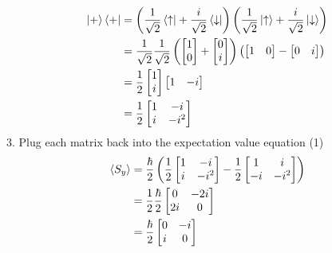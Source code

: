 \documentclass[12pt]{article}
\begin{document}
\begin{equation}
    \begin{split}
        \ket{+}\bra{+} &= \left(\frac{1}{\sqrt{2}}\bra{\uparrow} + \frac{i}{\sqrt{2}}\bra{\downarrow}\right)\left(\frac{1}{\sqrt{2}}\ket{\uparrow} + \frac{i}{\sqrt{2}}\ket{\downarrow}\right) \\
        &= \frac{1}{\sqrt{2}}\frac{1}{\sqrt{2}}\left(\begin{bmatrix} 1 \\ 0 \end{bmatrix} + \begin{bmatrix} 0 \\ i \end{bmatrix}\right)\left(\begin{bmatrix} 1 & 0 \end{bmatrix} - \begin{bmatrix} 0 & i \end{bmatrix}\right) \\
        &= \frac{1}{2}\begin{bmatrix} 1 \\ i \end{bmatrix}\begin{bmatrix} 1 & -i \end{bmatrix} \\
        &= \frac{1}{2}\begin{bmatrix} 1 & -i \\ i & -i^2 \end{bmatrix} \\
    \end{split}
\end{equation}
3. Plug each matrix back into the expectation value equation (1)
\begin{equation}
    \begin{split}
        \braket{S_y} &= \frac{\hbar}{2}\left(\frac{1}{2}\begin{bmatrix} 1 & -i \\ i & -i^2 \end{bmatrix} - \frac{1}{2}\begin{bmatrix} 1 & i \\ -i & -i^2 \end{bmatrix}\right) \\
        &= \frac{1}{2}\frac{\hbar}{2}\begin{bmatrix} 0 & -2i \\ 2i & 0 \end{bmatrix} \\
        &= \frac{\hbar}{2}\begin{bmatrix} 0 & -i \\ i & 0 \end{bmatrix} \\
    \end{split}
\end{equation}
\end{document}
